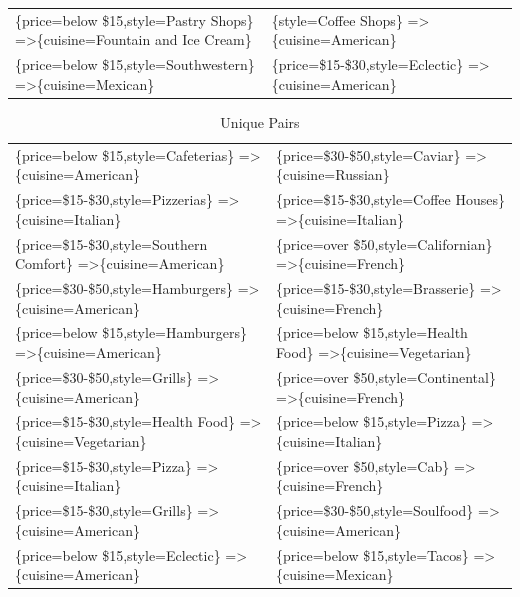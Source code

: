 \documentclass[letterpaper,10pt]{article}
\begin{document}
\begin{appendices}
\begin{table}[h]
\begin{adjustbox}{max width=\textwidth}
\begin{tabular}{ll}
\{price=below \$15,style=Pastry Shops\} =\textgreater \{cuisine=Fountain and Ice Cream\} & \{style=Coffee Shops\} =\textgreater \{cuisine=American\} \\ 
\{price=below \$15,style=Southwestern\} =\textgreater \{cuisine=Mexican\} & \{price=\$15-\$30,style=Eclectic\} =\textgreater \{cuisine=American\} \\ 
\end{tabular}
\end{adjustbox}
\end{table}
\begin{table}[h]
\caption*{Unique Pairs}
\begin{adjustbox}{max width=\textwidth}
\begin{tabular}{ll}
\{price=below \$15,style=Cafeterias\} =\textgreater \{cuisine=American\} & \{price=\$30-\$50,style=Caviar\} =\textgreater \{cuisine=Russian\} \\ 
\{price=\$15-\$30,style=Pizzerias\} =\textgreater \{cuisine=Italian\} & \{price=\$15-\$30,style=Coffee Houses\} =\textgreater \{cuisine=Italian\} \\ 
\{price=\$15-\$30,style=Southern Comfort\} =\textgreater \{cuisine=American\} & \{price=over \$50,style=Californian\} =\textgreater \{cuisine=French\} \\ 
\{price=\$30-\$50,style=Hamburgers\} =\textgreater \{cuisine=American\} & \{price=\$15-\$30,style=Brasserie\} =\textgreater \{cuisine=French\} \\ 
\{price=below \$15,style=Hamburgers\} =\textgreater \{cuisine=American\} & \{price=below \$15,style=Health Food\} =\textgreater \{cuisine=Vegetarian\} \\ 
\{price=\$30-\$50,style=Grills\} =\textgreater \{cuisine=American\} & \{price=over \$50,style=Continental\} =\textgreater \{cuisine=French\} \\ 
\{price=\$15-\$30,style=Health Food\} =\textgreater \{cuisine=Vegetarian\} & \{price=below \$15,style=Pizza\} =\textgreater \{cuisine=Italian\} \\ 
\{price=\$15-\$30,style=Pizza\} =\textgreater \{cuisine=Italian\} & \{price=over \$50,style=Cab\} =\textgreater \{cuisine=French\} \\ 
\{price=\$15-\$30,style=Grills\} =\textgreater \{cuisine=American\} & \{price=\$30-\$50,style=Soulfood\} =\textgreater \{cuisine=American\} \\ 
\{price=below \$15,style=Eclectic\} =\textgreater \{cuisine=American\} & \{price=below \$15,style=Tacos\} =\textgreater \{cuisine=Mexican\} \\ 

\end{tabular}
\end{adjustbox}
\end{table}
\end{appendices}
\end{document}
